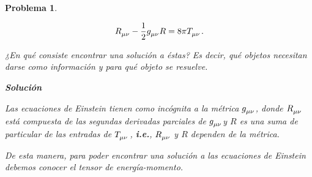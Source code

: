 \documentclass[12pt]{article}
\theoremstyle{break}
\newtheorem{exercise}{Problema}
\theoremstyle{nonumberbreak}
\newcommand*{\inlinesol}{\vspace*{10pt}\textbf{Solución}\vspace*{10pt}}
\begin{document}
\begin{exercise}
\begin{enumerate}[label = \alph*)]
            \begin{equation}
                \tensor{R}{_{\mu\nu}} - \dfrac{1}{2}\tensor{g}{_{\mu\nu}}R = 8\pi\tensor{T}{_{\mu\nu}}. 
                \label{eq:EinsteinEqs}
            \end{equation}

            ¿En qué consiste encontrar una solución a éstas? Es decir, qué objetos necesitan darse como información y para qué objeto se resuelve.

            \inlinesol

            Las ecuaciones de Einstein tienen como incógnita a la métrica \(\tensor{g}{_{\mu\nu}}\), donde \(\tensor{R}{_{\mu\nu}}\) está compuesta de las segundas derivadas parciales de \(\tensor{g}{_{\mu\nu}}\)y \(R\) es una suma de particular de las entradas de \(\tensor{T}{_{\mu\nu}}\), \textbf{i.e.}, \(\tensor{R}{_{\mu\nu}}\) y \(R\) dependen de la métrica.

            De esta manera, para poder encontrar una solución a las ecuaciones de Einstein debemos conocer el tensor de energía-momento.
        \end{enumerate}
    \end{exercise}
\end{document}
